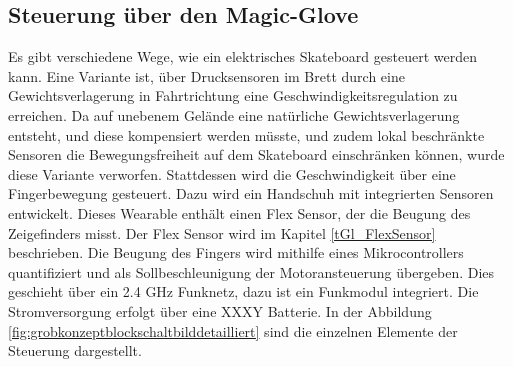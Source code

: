 \subsection*{Steuerung über den Magic-Glove}
Es gibt verschiedene Wege, wie ein elektrisches Skateboard gesteuert werden kann. Eine Variante ist, über Drucksensoren im Brett durch eine Gewichtsverlagerung in Fahrtrichtung eine Geschwindigkeitsregulation zu erreichen. Da auf unebenem Gelände eine natürliche Gewichtsverlagerung entsteht, und diese kompensiert werden müsste, und zudem lokal beschränkte Sensoren die Bewegungsfreiheit auf dem Skateboard einschränken können, wurde diese Variante verworfen. Stattdessen wird die Geschwindigkeit über eine Fingerbewegung gesteuert. Dazu wird ein Handschuh mit integrierten Sensoren entwickelt. Dieses Wearable enthält einen Flex Sensor, der die Beugung des Zeigefinders misst. Der Flex Sensor wird im Kapitel \ref{tGl_FlexSensor} beschrieben. Die Beugung des Fingers wird mithilfe eines Mikrocontrollers quantifiziert und als Sollbeschleunigung der Motoransteuerung übergeben. Dies geschieht über ein 2.4 GHz Funknetz, dazu ist ein Funkmodul integriert. Die Stromversorgung erfolgt über eine XXXY Batterie. 
In der Abbildung \ref{fig:grobkonzeptblockschaltbilddetailliert} sind die einzelnen Elemente der Steuerung dargestellt.

